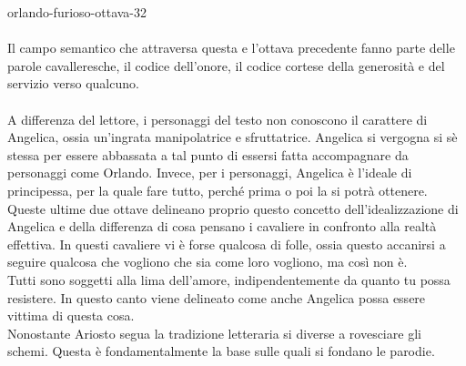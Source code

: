 \documentclass[preview]{standalone}
\begin{document}
\begin{snippet}{orlando-furioso-ottava-32}
    \\\\
    Il campo semantico che attraversa questa e l'ottava precedente fanno
    parte delle parole cavalleresche, il codice dell'onore, il codice cortese
    della generosità e del servizio verso qualcuno.
    \\\\
    A differenza del lettore, i personaggi del testo non conoscono il carattere di Angelica,
    ossia un'ingrata manipolatrice e sfruttatrice.
    Angelica si vergogna si sè stessa per essere abbassata a tal punto di essersi fatta accompagnare
    da personaggi come Orlando.
    Invece, per i personaggi, Angelica è l'ideale di principessa, per la quale fare tutto,
    perché prima o poi la si potrà ottenere.
    Queste ultime due ottave delineano proprio questo concetto dell'idealizzazione di Angelica
    e della differenza di cosa pensano i cavaliere in confronto alla realtà effettiva.
    In questi cavaliere vi è forse qualcosa di folle, ossia questo accanirsi a seguire qualcosa
    che vogliono che sia come loro vogliono, ma così non è.
    \\
    Tutti sono soggetti alla lima dell'amore, indipendentemente da quanto tu possa resistere.
    In questo canto viene delineato come anche Angelica possa essere vittima di questa cosa.
    \\
    Nonostante Ariosto segua la tradizione letteraria si diverse a rovesciare gli schemi.
    Questa è fondamentalmente la base sulle quali si fondano le parodie.
\end{snippet}
\end{document}
